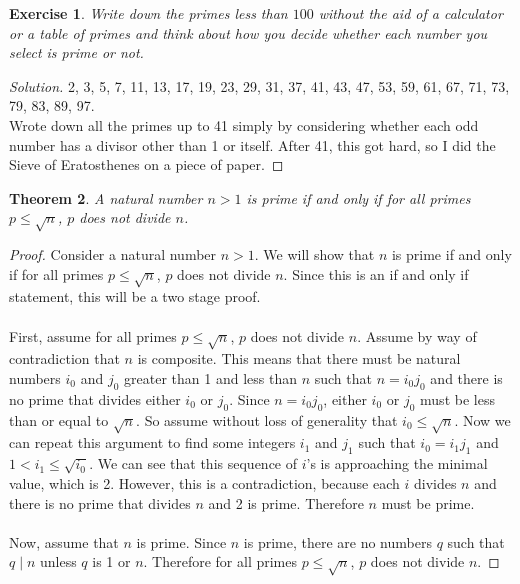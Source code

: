 \documentclass[12pt,leqno]{article}
\numberwithin{equation}{section}
\newtheorem{thm}{Theorem}[section]
\newtheorem{exer}[thm]{Exercise}
\theoremstyle{definition}
\begin{document}

\begin{exer}
Write down the primes less than $100$ without the aid of a
calculator or a table of primes and think about how you decide
whether each number you select is prime or not.
\end{exer}

\begin{proof}[Solution]
2, 3, 5, 7, 11, 13, 17, 19, 23, 29, 31, 37, 41, 43, 47, 53, 59, 61, 67, 71, 73, 79, 83, 89, 97.\\
Wrote down all the primes up to 41 simply by considering whether each odd number has a divisor other than 1 or itself.  After 41, this got hard, so I did the Sieve of Eratosthenes on a piece of paper.
\end{proof}

\pagebreak

\begin{thm}
A natural number $n>1$ is prime if and only if for all primes $p
\leq \sqrt{n}$, $p$ does not divide $n$.
\end{thm}

\begin{proof}[Proof]
Consider a natural number $n > 1$.  We will show that $n$ is prime if and only if for all primes $p \leq \sqrt{n}$, $p$ does not divide $n$.  Since this is an if and only if statement, this will be a two stage proof.\\
\\
First, assume for all primes $p \leq \sqrt{n}$, $p$ does not divide $n$. Assume by way of contradiction that $n$ is composite.  This means that there must be natural numbers $i_0$ and $j_0$ greater than 1 and less than $n$ such that $n = i_0j_0$ and there is no prime that divides either $i_0$ or $j_0$.  Since $n = i_0j_0$, either $i_0$ or $j_0$ must be less than or equal to $\sqrt{n}$.  So assume without loss of generality that $i_0 \leq \sqrt{n}$.  Now we can repeat this argument to find some integers $i_1$ and $j_1$ such that $i_0 = i_1j_1$ and $1 < i_1 \leq \sqrt{i_0}$.  We can see that this sequence of $i$'s is approaching the minimal value, which is 2.  However, this is a contradiction, because each $i$ divides $n$ and there is no prime that divides $n$ and 2 is prime.  Therefore $n$ must be prime.\\
\\
Now, assume that $n$ is prime.  Since $n$ is prime, there are no numbers $q$ such that $q \mid n$ unless $q$ is 1 or $n$.  Therefore for all primes $p \leq \sqrt{n}$, $p$ does not divide $n$.
\end{proof}
\end{document}
